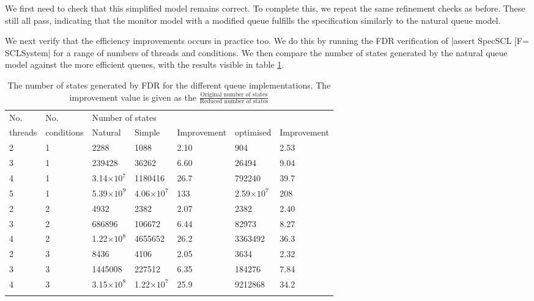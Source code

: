 We first need to check that this simplified model remains correct. To complete this, we repeat the same refinement checks as before. These still all pass, indicating that the monitor model with a modified queue fulfills the specification similarly to the natural queue model.

We next verify that the efficiency improvements occurs in practice too. We do this by running the FDR verification of |assert SpecSCL [F= SCLSystem| for a range of numbers of threads and conditions. We then compare the number of states generated by the natural queue model against the more efficient queues, with the results visible in table \ref{table:queue}.

\def\thickhline{\noalign{\hrule height 1.5pt}}

\begin{table}
  \renewcommand*{\arraystretch}{1.2}
  \caption{The number of states generated by FDR for the different queue implementations. The improvement value is given as the $\frac{\text{Original number of states}}{\text{Reduced number of states}}$}
    \begin{tabularx}{\linewidth}{|l|l|X|X|X|X|X|}
      \thickhline
      No.&No.& \multicolumn{5}{l|}{Number of states} \\
      threads&conditions& Natural & Simple & Improvement & optimised & Improvement\\
      \thickhline
      2 & 1 & 2288 & 1088 & 2.10& 904 & 2.53\\ \hline
      3 & 1 & 239428 & 36262 & 6.60& 26494 & 9.04 \\ \hline
      4 & 1 & 3.14$\times\text{10}^\text{7}$ & 1180416 & 26.7& 792240 & 39.7\\ \hline
      5 & 1 & 5.39$\times\text{10}^\text{9}$ & 4.06$\times\text{10}^\text{7}$ & 133& 2.59$\times\text{10}^\text{7}$ &208 \\
      \thickhline
      2 & 2 & 4932 & 2382 & 2.07& 2382 & 2.40\\ \hline
      3 & 2 & 686896 & 106672 & 6.44& 82973 & 8.27\\ \hline
      4 & 2 & 1.22$\times\text{10}^\text{8}$ & 4655652 & 26.2& 3363492 & 36.3\\ 
      \thickhline
      2 & 3 & 8436 & 4106 & 2.05& 3634 & 2.32\\ \hline
      3 & 3 & 1445008 & 227512 & 6.35 & 184276 & 7.84\\ \hline
      4 & 3 & 3.15$\times\text{10}^\text{8}$ & 1.22$\times\text{10}^\text{7}$ & 25.9& 9212868 & 34.2\\ 
      \thickhline
    \end{tabularx}
    \label{table:queue}
  \end{table}

